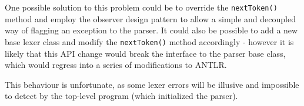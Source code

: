 One possible solution to this problem could be to override the
\verb!nextToken()! method and employ the observer design pattern to allow a
simple and decoupled way of flagging an exception to the parser. It could also
be possible to add a new base lexer class and modify the \verb!nextToken()!
method accordingly - however it is likely that this API change would break the
interface to the parser base class, which would regress into a series of
modifications to ANTLR. 

This behaviour is unfortunate, as some lexer errors will be illusive and
impossible to detect by the top-level program (which initialized the parser). 
